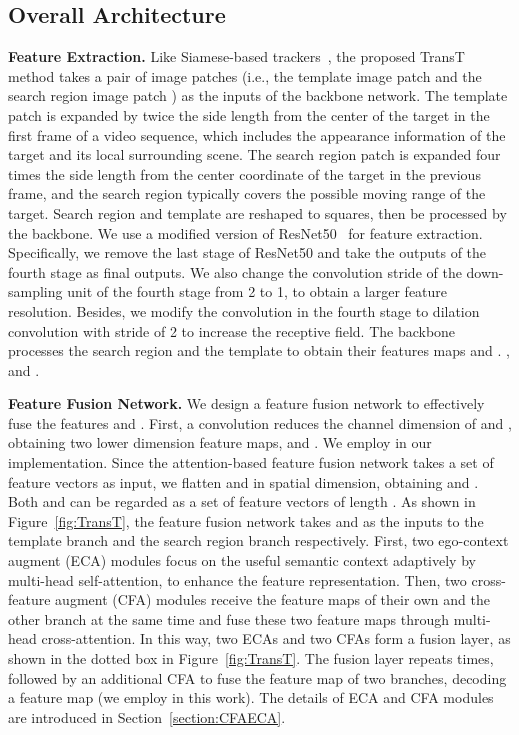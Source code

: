 \documentclass[final]{cvpr}
\begin{document}
\subsection{Overall Architecture}
{\noindent \textbf{Feature Extraction. }}
Like Siamese-based trackers~\cite{SiameseFC,SiameseRPN}, the proposed TransT method takes a pair of image patches 
(i.e., the template image patch  and the search region 
image patch ) as the inputs of the backbone network. 
The template patch is expanded by twice the side length from the center of the target in the first frame of 
a video sequence, which includes the appearance information of the target and its local surrounding scene. 
The search region patch is expanded four times the side length from the center coordinate of the target 
in the previous frame, and the search region typically covers the possible moving range of the target. 
Search region and template are reshaped to squares, then be processed by the backbone. 
We use a modified version of ResNet50~\cite{ResNet} for feature extraction. 
Specifically, we remove the last stage of ResNet50 and take the outputs of the fourth stage as final 
outputs. We also change the convolution stride of the down-sampling unit of the fourth stage from 
2 to 1, to obtain a larger feature resolution. 
Besides, we modify the  convolution in the fourth stage to dilation convolution with 
stride of 2 to increase the receptive field. 
The backbone processes the search region and the template to obtain their features maps 
 and .
,  and .

{\noindent \textbf{Feature Fusion Network. }}
We design a feature fusion network to effectively fuse the features  and . First, a  convolution reduces the channel dimension of  and , obtaining two lower dimension feature maps,   and . We employ  in our implementation. Since the attention-based feature fusion network takes a set of feature vectors as input, we flatten  and  in spatial dimension, obtaining  and .  Both  and  can be regarded as a set of feature vectors of length .  
As shown in Figure~\ref{fig:TransT}, the feature fusion network takes  and  as the inputs to 
the template branch and the search region branch respectively.
First, two ego-context augment (ECA) modules focus on the useful 
semantic context adaptively by multi-head self-attention, to enhance the feature representation.
Then, two cross-feature augment (CFA) modules receive the feature maps of their own and the other branch 
at the same time and fuse these two feature maps through multi-head cross-attention. 
In this way, two ECAs and two CFAs form a fusion layer, as shown in the dotted box in Figure~\ref{fig:TransT}. 
The fusion layer repeats  times, followed by an additional CFA to fuse the feature map of two branches, 
decoding a feature map  (we employ  in this work). 
The details of ECA and CFA modules are introduced in Section~\ref{section:CFAECA}.
\end{document}
